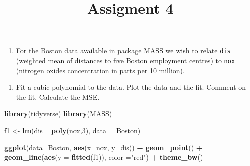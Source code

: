 \documentclass[]{article}
\title{Assigment 4}
\author{}
\date{}
\newenvironment{Shaded}{\begin{snugshade}}{\end{snugshade}}
\newcommand{\DataTypeTok}[1]{\textcolor[rgb]{0.13,0.29,0.53}{#1}}
\newcommand{\DecValTok}[1]{\textcolor[rgb]{0.00,0.00,0.81}{#1}}
\newcommand{\KeywordTok}[1]{\textcolor[rgb]{0.13,0.29,0.53}{\textbf{#1}}}
\newcommand{\NormalTok}[1]{#1}
\newcommand{\OperatorTok}[1]{\textcolor[rgb]{0.81,0.36,0.00}{\textbf{#1}}}
\newcommand{\StringTok}[1]{\textcolor[rgb]{0.31,0.60,0.02}{#1}}
\providecommand{\tightlist}{%
  \setlength{\itemsep}{0pt}\setlength{\parskip}{0pt}}
\begin{document}
\maketitle

\begin{enumerate}
\def\labelenumi{\arabic{enumi}.}
\tightlist
\item
  For the Boston data available in package MASS we wish to relate
  \texttt{dis} (weighted mean of distances to five Boston employment
  centres) to \texttt{nox} (nitrogen oxides concentration in parts per
  10 million).
\end{enumerate}

\begin{enumerate}
\def\labelenumi{(\alph{enumi})}
\tightlist
\item
  Fit a cubic polynomial to the data. Plot the data and the fit. Comment
  on the fit. Calculate the MSE.
\end{enumerate}

\begin{Shaded}
\begin{Highlighting}[]
\KeywordTok{library}\NormalTok{(tidyverse)}
\KeywordTok{library}\NormalTok{(MASS)}

\NormalTok{f1 <-}\StringTok{ }\KeywordTok{lm}\NormalTok{(dis }\OperatorTok{~}\StringTok{ }\KeywordTok{poly}\NormalTok{(nox,}\DecValTok{3}\NormalTok{), }\DataTypeTok{data =}\NormalTok{ Boston)}

\KeywordTok{ggplot}\NormalTok{(}\DataTypeTok{data=}\NormalTok{Boston, }\KeywordTok{aes}\NormalTok{(}\DataTypeTok{x=}\NormalTok{nox, }\DataTypeTok{y=}\NormalTok{dis)) }\OperatorTok{+}\StringTok{ }
\StringTok{  }\KeywordTok{geom_point}\NormalTok{() }\OperatorTok{+}\StringTok{ }
\StringTok{  }\KeywordTok{geom_line}\NormalTok{(}\KeywordTok{aes}\NormalTok{(}\DataTypeTok{y =} \KeywordTok{fitted}\NormalTok{(f1)), }\DataTypeTok{color =}\StringTok{"red"}\NormalTok{) }\OperatorTok{+}
\StringTok{  }\KeywordTok{theme_bw}\NormalTok{()}
\end{Highlighting}
\end{Shaded}
\end{document}
